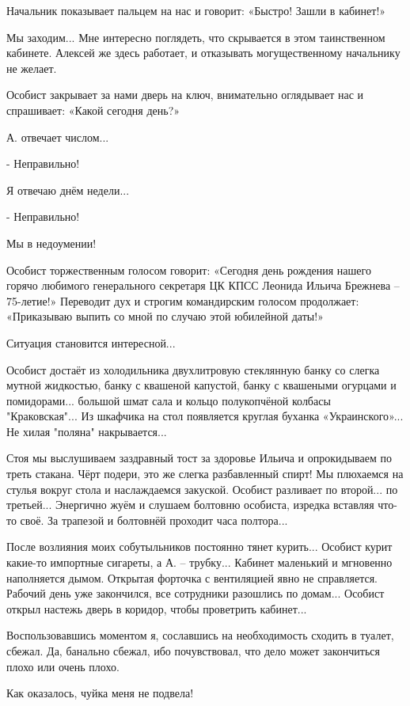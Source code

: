 Начальник показывает пальцем на нас и говорит: «Быстро! Зашли в кабинет!» 

Мы заходим... Мне интересно поглядеть, что скрывается в этом таинственном
кабинете. Алексей же здесь работает, и отказывать могущественному начальнику не
желает.

Особист закрывает за нами дверь на ключ, внимательно оглядывает нас и
спрашивает: «Какой сегодня день?»

А. отвечает числом...

- Неправильно!

Я отвечаю днём недели...

- Неправильно!

Мы в недоумении!

Особист торжественным голосом говорит: «Сегодня день рождения нашего горячо
любимого генерального секретаря ЦК КПСС Леонида Ильича Брежнева – 75-летие!»
Переводит дух и строгим командирским голосом продолжает: «Приказываю выпить со
мной по случаю этой юбилейной даты!»

Ситуация становится интересной...

Особист достаёт из холодильника двухлитровую стеклянную банку со слегка мутной
жидкостью, банку с квашеной капустой, банку с квашеными огурцами и помидорами...
большой шмат сала и кольцо полукопчёной колбасы "Краковская"... Из шкафчика на
стол появляется круглая буханка «Украинского»... Не хилая "поляна"
накрывается...

Стоя мы выслушиваем заздравный тост за здоровье Ильича и опрокидываем по треть
стакана. Чёрт подери, это же слегка разбавленный спирт! Мы плюхаемся на стулья
вокруг стола и наслаждаемся закуской. Особист разливает по второй... по третьей...
Энергично жуём и слушаем болтовню особиста, изредка вставляя что-то своё. За
трапезой и болтовнёй проходит часа полтора...

После возлияния моих собутыльников постоянно тянет курить... Особист курит
какие-то импортные сигареты, а А. – трубку... Кабинет маленький и мгновенно
наполняется дымом. Открытая форточка с вентиляцией явно не справляется. Рабочий
день уже закончился, все сотрудники разошлись по домам... Особист открыл настежь
дверь в коридор, чтобы проветрить кабинет... 

Воспользовавшись моментом я, сославшись на необходимость сходить в туалет,
сбежал. Да, банально сбежал, ибо почувствовал, что дело может закончиться плохо
или очень плохо. 

Как оказалось, чуйка меня не подвела!

